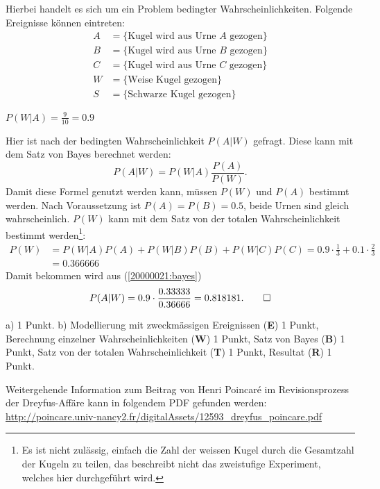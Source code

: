 \begin{loesung}
Hierbei handelt es sich um ein Problem bedingter Wahrscheinlichkeiten.
Folgende Ereignisse können eintreten:
\begin{align*}
A&=\{\text{Kugel wird aus Urne $A$ gezogen}\}\\
B&=\{\text{Kugel wird aus Urne $B$ gezogen}\}\\
C&=\{\text{Kugel wird aus Urne $C$ gezogen}\}\\
W&=\{\text{Weise Kugel gezogen}\}\\
S&=\{\text{Schwarze Kugel gezogen}\}
\end{align*}
\begin{teilaufgaben}
\item $P(W|A)=\frac{9}{10}= 0.9$
\item Hier ist nach der bedingten Wahrscheinlichkeit $P(A|W)$ gefragt.
Diese kann mit dem Satz von Bayes berechnet werden:
\begin{equation}
P(A|W)=P(W|A)\frac{P(A)}{P(W)}.
\label{20000021:bayes}
\end{equation}
Damit diese Formel genutzt werden kann, müssen $P(W)$ und $P(A)$
bestimmt werden.
Nach Voraussetzung ist $P(A)=P(B)=0.5$, beide Urnen sind gleich
wahrscheinlich. $P(W)$ kann mit dem Satz von der totalen
Wahrscheinlichkeit bestimmt werden\footnote{Es ist nicht zulässig,
einfach die Zahl der weissen Kugel durch die Gesamtzahl der Kugeln
zu teilen, das beschreibt nicht das zweistufige Experiment, welches hier
durchgeführt wird.}:
\begin{align*}
P(W)&=P(W|A)P(A)+P(W|B)P(B)+P(W|C)P(C)
     =0.9\cdot \frac13+0.1\cdot \frac23
\\
    &=0.366666
\end{align*}
Damit bekommen wird aus
(\ref{20000021:bayes})
\[
P(A|W)=0.9\cdot\frac{0.33333}{0.36666}=0.818181.
\qedhere
\]
\end{teilaufgaben}
\end{loesung}

\begin{bewertung}
a) 1 Punkt.
b) Modellierung mit zweckmässigen Ereignissen ({\bf E}) 1 Punkt,
Berechnung einzelner Wahrscheinlichkeiten ({\bf W}) 1 Punkt,
Satz von Bayes ({\bf B}) 1 Punkt,
Satz von der totalen Wahrscheinlichkeit ({\bf T}) 1 Punkt,
Resultat ({\bf R}) 1 Punkt.
\end{bewertung}

\begin{diskussion}
Weitergehende Information zum Beitrag von Henri Poincar\'e im Revisionsprozess
der Dreyfus-Affäre kann in folgendem PDF gefunden werden:
\url{http://poincare.univ-nancy2.fr/digitalAssets/12593_dreyfus_poincare.pdf}
\end{diskussion}


